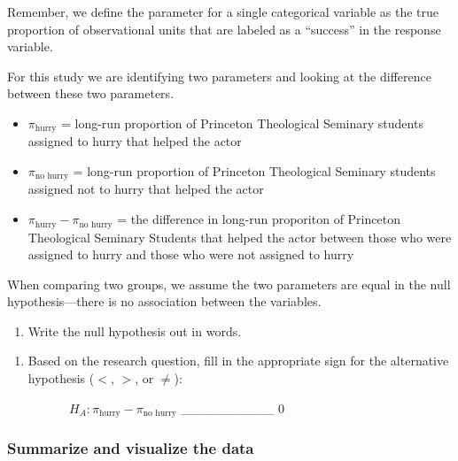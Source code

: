 \documentclass[
]{report}
\providecommand{\tightlist}{%
  \setlength{\itemsep}{0pt}\setlength{\parskip}{0pt}}
\begin{document}
Remember, we define the parameter for a single categorical variable as the true proportion of observational units that are labeled as a ``success'' in the response variable.

For this study we are identifying two parameters and looking at the difference between these two parameters.

\begin{itemize}
\item
  \(\pi_\text{hurry}\) = long-run proportion of Princeton Theological Seminary students assigned to hurry that helped the actor
\item
  \(\pi_\text{no hurry}\) = long-run proportion of Princeton Theological Seminary students assigned not to hurry that helped the actor
\item
  \(\pi_\text{hurry} - \pi_\text{no hurry}\) = the difference in long-run proporiton of Princeton Theological Seminary Students that helped the actor between those who were assigned to hurry and those who were not assigned to hurry
\end{itemize}

When comparing two groups, we assume the two parameters are equal in the null hypothesis---there is no association between the variables.

\begin{enumerate}
\def\labelenumi{\arabic{enumi}.}
\tightlist
\item
  Write the null hypothesis out in words.
\end{enumerate}

\vspace{0.4in}

\begin{enumerate}
\def\labelenumi{\arabic{enumi}.}
\setcounter{enumi}{1}
\tightlist
\item
  Based on the research question, fill in the appropriate sign for the alternative hypothesis (\(<\), \(>\), or \(\neq\)):
  \vspace{2mm}
\end{enumerate}

~~~~~~~~~~\(H_A: \pi_{\text{hurry}} -\pi_{\text{no hurry}}\) \_\_\_\_\_\_\_\_\_\_ 0

\subsubsection*{Summarize and visualize the data}\label{summarize-and-visualize-the-data-3}
\end{document}
